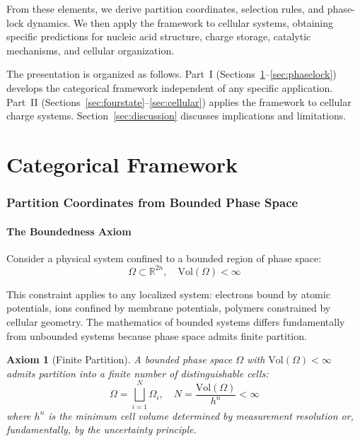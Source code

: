 \documentclass[twocolumn,aps,prb,superscriptaddress,longbibliography,floatfix]{revtex4-2}
\newtheorem{axiom}[theorem]{Axiom}
\theoremstyle{remark}
\begin{document}
From these elements, we derive partition coordinates, selection rules,
and phase-lock dynamics. We then apply the framework to cellular systems,
obtaining specific predictions for nucleic acid structure, charge
storage, catalytic mechanisms, and cellular organization.

The presentation is organized as follows. Part~I
(Sections~\ref{sec:partition}--\ref{sec:phaselock}) develops the
categorical framework independent of any specific application. Part~II
(Sections~\ref{sec:fourstate}--\ref{sec:cellular}) applies the framework
to cellular charge systems. Section~\ref{sec:discussion} discusses
implications and limitations.

\part{Categorical Framework}

\section{Partition Coordinates from Bounded Phase Space}
\label{sec:partition}

\subsection{The Boundedness Axiom}

Consider a physical system confined to a bounded region of phase space:
\begin{equation}
\Omega \subset \mathbb{R}^{2n}, \quad \text{Vol}(\Omega) < \infty
\label{eq:bounded}
\end{equation}

This constraint applies to any localized system: electrons bound by
atomic potentials, ions confined by membrane potentials, polymers
constrained by cellular geometry. The mathematics of bounded systems
differs fundamentally from unbounded systems because phase space admits
finite partition.

\begin{axiom}[Finite Partition]
\label{ax:finite}
A bounded phase space $\Omega$ with $\text{Vol}(\Omega) < \infty$ admits
partition into a finite number of distinguishable cells:
\begin{equation}
\Omega = \bigsqcup_{i=1}^{N} \Omega_i, \quad N = \frac{\text{Vol}(\Omega)}{h^n} < \infty
\label{eq:partition}
\end{equation}
where $h^n$ is the minimum cell volume determined by measurement
resolution or, fundamentally, by the uncertainty principle.
\end{axiom}
\end{document}
